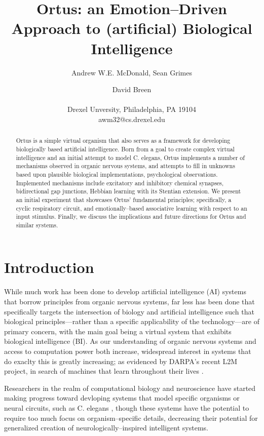 \documentclass[letterpaper]{article}
\title{Ortus: an Emotion--Driven Approach to (artificial) Biological Intelligence}
\author{Andrew W.E. McDonald, Sean Grimes \and David Breen \\
\mbox{}\\
Drexel Unversity, Philadelphia, PA 19104 \\
awm32@cs.drexel.edu} %
\begin{document}
\maketitle

\begin{abstract}
 Ortus is a simple virtual organism that also serves as a framework for developing biologically based artificial intelligence. Born from a goal to create complex virtual intelligence and an initial attempt to model C. elegans, Ortus implements a number of mechanisms observed in organic nervous systems, and attempts to fill in unknowns based upon plausible biological implementations, psychological observations. Implemented mechanisms include excitatory and inhibitory chemical synapses, bidirectional gap junctions, Hebbian learning with its Stentian extension.  We present an initial experiment that showcases Ortus’ fundamental principles; specifically, a cyclic respiratory circuit, and emotionally--based associative learning with respect to an input stimulus. Finally, we discuss the implications and future directions for Ortus and similar systems.


\end{abstract}

\section{Introduction}


While much work has been done to develop artificial intelligence (AI) systems that borrow principles from organic nervous systems, far less has been done that specifically targets the intersection of biology and artificial intelligence such that biological principles---rather than a specific applicability of the technology---are of primary concern, with the main goal being a virtual system that exhibits biological intelligence (BI). As our understanding of organic nervous systems and access to computation power both increase, widespread interest in systems that do exaclty this is greatly increasing; as evidenced by DARPA's recent L2M project, in search of machines that learn throughout their lives \citep{darpa}.


Researchers in the realm of computational biology and neuroscience have started making progress toward devloping systems that model specific organisms or neural circuits, such as C. elegans \citep{Izquierdo2016}, though these systems have the potential to require too much focus on organism--specific details, decreasing their potential for generalized creation of neurologically--inspired intelligent systems.
\end{document}
